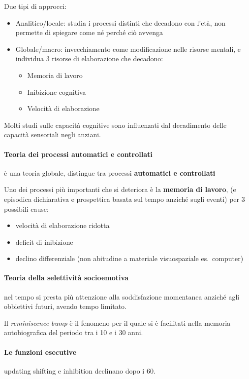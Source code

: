 \documentclass[12pt, a4paper]{article}
\begin{document}
Due tipi di approcci:
\begin{itemize}
    \item Analitico/locale: studia i processi distinti che decadono con l'età, non permette di spiegare come né perché ciò avvenga
    \item Globale/macro: invecchiamento come modificazione nelle risorse mentali, e individua 3 risorse di elaborazione che decadono: 
        \begin{itemize}
            \item Memoria di lavoro
            \item Inibizione cognitiva
            \item Velocità di elaborazione
        \end{itemize}
\end{itemize}

Molti studi sulle capacità cognitive sono influenzati dal decadimento delle capacità sensoriali negli anziani.

\paragraph{Teoria dei processi automatici e controllati}  è una teoria globale, distingue tra processi \textbf{automatici e controllati} 

Uno dei processi più importanti che si deteriora è la \textbf{memoria di lavoro}, (e episodica dichiarativa e prospettica basata sul tempo anziché sugli eventi) per 3 possibili cause:
\begin{itemize}
    \item velocità di elaborazione ridotta
    \item deficit di inibizione
    \item declino differenziale (non abitudine a materiale visuospaziale es.\ computer)
\end{itemize}

\paragraph{Teoria della selettività socioemotiva}  nel tempo si presta più attenzione alla soddisfazione momentanea anziché  agli obbiettivi futuri, avendo tempo limitato.


Il \emph{reminiscence bump} è il fenomeno per il quale si è facilitati nella memoria autobiografica del periodo tra i 10 e i 30 anni.

\paragraph{Le funzioni esecutive}  updating shifting e inhibition declinano dopo i 60.
\end{document}
